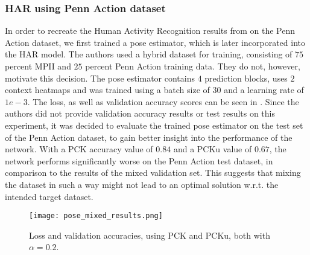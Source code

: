 \begin{table}[]
    \centering
    \caption{Our recreation in direct comparison to the original work by \cite{luvizon_2d/3d_2018}. Values represent PCKh using $\alpha = 0.5$.  } %
    \label{tab:mpii_test}
\end{table}


\subsubsection{HAR using Penn Action dataset}
In order to recreate the Human Activity Recognition results from \cite{luvizon_2d/3d_2018} on the Penn Action dataset, we first trained a pose estimator, which is later incorporated into the HAR model.
The authors used a hybrid dataset for training, consisting of $75$ percent MPII and $25$ percent Penn Action training data.
They do not, however, motivate this decision.
The pose estimator contains $4$ prediction blocks, uses $2$ context heatmaps and was trained using a batch size of $30$ and a learning rate of $1e-3$.
The loss, as well as validation accuracy scores can be seen in .
Since the authors did not provide validation accuracy results or test results on this experiment, it was decided to evaluate the trained pose estimator on the test set of the Penn Action dataset, to gain better insight into the performance of the network.
With a PCK accuracy value of $0.84$ and a PCKu value of $0.67$, the network performs significantly worse on the Penn Action test dataset, in comparison to the results of the mixed validation set.
This suggests that mixing the dataset in such a way might not lead to an optimal solution w.r.t. the intended target dataset.

\begin{figure}[htb!]
    \centering
    \texttt{[image: pose\_mixed\_results.png]}
    \caption{Loss and validation accuracies, using PCK and PCKu, both with $\alpha = 0.2$.}
    \label{fig:pose_mixed_results}
\end{figure}

